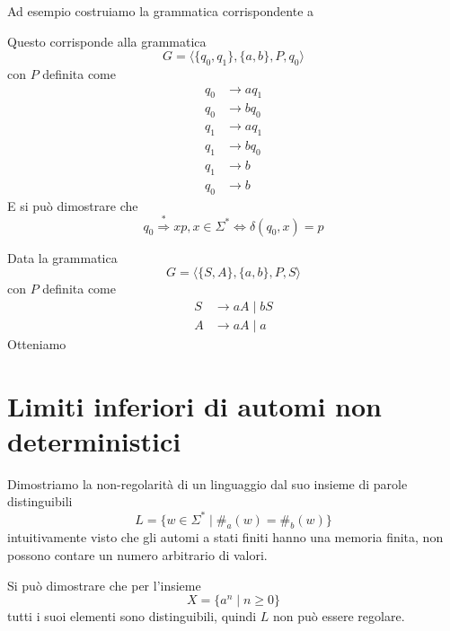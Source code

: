\documentclass[12pt]{article}
\begin{document}
\begin{tcolorbox}
	Ad esempio costruiamo la grammatica corrispondente a 
	\begin{center}
	\end{center}
	Questo corrisponde alla grammatica
	$$ G = \langle \{ q_0, q_1 \}, \{ a, b \}, P, q_0 \rangle$$
	con $P$ definita come
	\begin{align*}
		q_0 &\rightarrow a q_1 \\
		q_0 &\rightarrow b q_0 \\
		q_1 &\rightarrow a q_1 \\
		q_1 &\rightarrow b q_0 \\
		q_1 &\rightarrow b \\
		q_0 &\rightarrow b
	\end{align*}
	E si può dimostrare che
	$$ q_0 \overset{*}{\Rightarrow} x p, x \in \Sigma^* \Leftrightarrow \delta(q_0, x) = p $$
\end{tcolorbox}
\begin{tcolorbox}
	Data la grammatica
	$$ G = \langle \{S, A\}, \{a, b\}, P, S \rangle$$
	con $P$ definita come
	\begin{align*}
		S &\rightarrow a A \mid b S \\
		A &\rightarrow a A \mid a 
	\end{align*}
	Otteniamo
	\begin{center}
	\end{center}
\end{tcolorbox}

\section{Limiti inferiori di automi non deterministici}
\begin{tcolorbox}
	Dimostriamo la non-regolarità di un linguaggio dal suo insieme di parole distinguibili
	$$ L = \{ w \in \Sigma^* \mid \#_a(w) = \#_b(w) \} $$
	intuitivamente visto che gli automi a stati finiti hanno una memoria finita, non possono contare un numero arbitrario di valori.

	Si può dimostrare che per l'insieme
	$$ X = \{ a^n \mid n \geq 0 \} $$
	tutti i suoi elementi sono distinguibili, quindi $L$ non può essere regolare.
\end{tcolorbox}
\end{document}
